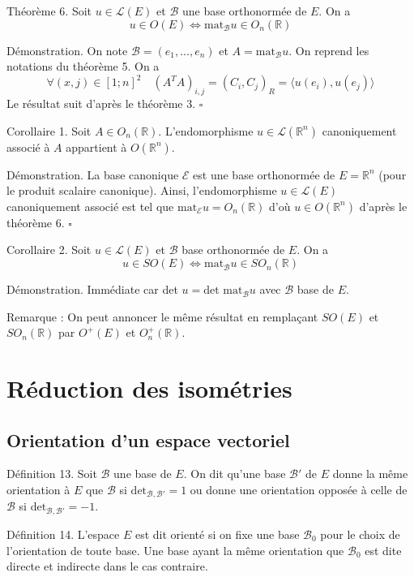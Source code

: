 Théorème 6. Soit $u \in \mathcal{L}(E)$ et $\mathcal{B}$ une base orthonormée de $E$. On a
\[ u \in O(E) \iff \text{mat}_{\mathcal{B}} u \in O_n(\mathbb{R}) \]

Démonstration. On note $\mathcal{B} = (e_1, ..., e_n)$ et $A = \text{mat}_{\mathcal{B}} u$. On reprend les notations du théorème 5. On a
\[ \forall (x, j) \in [1; n]^2 \quad (A^T A)_{i,j} = (C_i, C_j)_{R} = \langle u(e_i), u(e_j) \rangle \]
Le résultat suit d'après le théorème 3. \hfill $\square$

Corollaire 1. Soit $A \in O_n(\mathbb{R})$. L'endomorphisme $u \in \mathcal{L}(\mathbb{R}^n)$ canoniquement associé à $A$ appartient à $O(\mathbb{R}^n)$.

Démonstration. La base canonique $\mathcal{E}$ est une base orthonormée de $E = \mathbb{R}^n$ (pour le produit scalaire canonique). Ainsi, l'endomorphisme $u \in \mathcal{L}(E)$ canoniquement associé est tel que $\text{mat}_{\mathcal{E}} u = O_n(\mathbb{R})$ d'où $u \in O(\mathbb{R}^n)$ d'après le théorème 6. \hfill $\square$

Corollaire 2. Soit $u \in \mathcal{L}(E)$ et $\mathcal{B}$ base orthonormée de $E$. On a
\[ u \in SO(E) \iff \text{mat}_{\mathcal{B}} u \in SO_n(\mathbb{R}) \]

Démonstration. Immédiate car det $u = \text{det mat}_{\mathcal{B}} u$ avec $\mathcal{B}$ base de $E$.

Remarque : On peut annoncer le même résultat en remplaçant $SO(E)$ et $SO_n(\mathbb{R})$ par $O^+(E)$ et $O_n^+(\mathbb{R})$.

\section{Réduction des isométries}

\subsection{Orientation d'un espace vectoriel}

Définition 13. Soit $\mathcal{B}$ une base de $E$. On dit qu'une base $\mathcal{B}'$ de $E$ donne la même orientation à $E$ que $\mathcal{B}$ si $\text{det}_{\mathcal{B}, \mathcal{B}'} = 1$ ou donne une orientation opposée à celle de $\mathcal{B}$ si $\text{det}_{\mathcal{B}, \mathcal{B}'} = -1$.

Définition 14. L'espace $E$ est dit orienté si on fixe une base $\mathcal{B}_0$ pour le choix de l'orientation de toute base. Une base ayant la même orientation que $\mathcal{B}_0$ est dite directe et indirecte dans le cas contraire.

